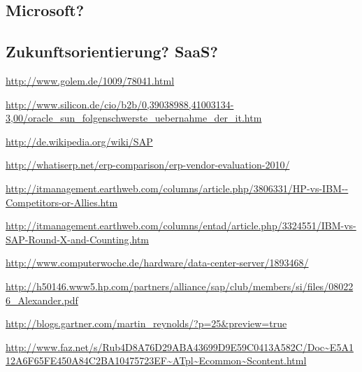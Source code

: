 \documentclass[a4paper,10pt,left=1.5cm,right=1.5cm,top=1.5cm,bottom=1.5cm]{article}
\begin{document}
\subsection*{}
\subsection*{Microsoft?}
\subsection*{Zukunftsorientierung? SaaS?}

\begin{thebibliography}{5}
  \newblock \url{http://www.golem.de/1009/78041.html}

  \newblock \url{http://www.silicon.de/cio/b2b/0,39038988,41003134-3,00/oracle_sun_folgenschwerste_uebernahme_der_it.htm}

  \newblock \url{http://de.wikipedia.org/wiki/SAP}

  \newblock \url{http://whatiserp.net/erp-comparison/erp-vendor-evaluation-2010/}

  \newblock \url{http://itmanagement.earthweb.com/columns/article.php/3806331/HP-vs-IBM--Competitors-or-Allies.htm}

  \newblock \url{http://itmanagement.earthweb.com/columns/entad/article.php/3324551/IBM-vs-SAP-Round-X-and-Counting.htm}

  \newblock \url{http://www.computerwoche.de/hardware/data-center-server/1893468/}

  \newblock \url{http://h50146.www5.hp.com/partners/alliance/sap/club/members/si/files/080226_Alexander.pdf}

  \newblock \url{http://blogs.gartner.com/martin_reynolds/?p=25&preview=true}

  \newblock \url{http://www.faz.net/s/Rub4D8A76D29ABA43699D9E59C0413A582C/Doc~E5A112A6F65FE450A84C2BA10475723EF~ATpl~Ecommon~Scontent.html}
\end{thebibliography}
\end{document}
